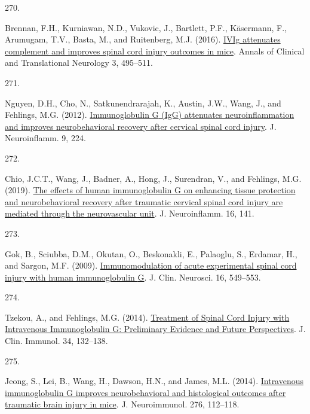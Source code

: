 \documentclass[
]{article}
\newlength{\cslhangindent}
\newlength{\csllabelwidth}
\newlength{\cslentryspacingunit} %
\newenvironment{CSLReferences}[2] %
 {%
  \setlength{\parindent}{0pt}
  \ifodd #1
  \let\oldpar\par
  \def\par{\hangindent=\cslhangindent\oldpar}
  \fi
  \setlength{\parskip}{#2\cslentryspacingunit}
 }%
 {}
\newcommand{\CSLLeftMargin}[1]{\parbox[t]{\csllabelwidth}{#1}}
\newcommand{\CSLRightInline}[1]{\parbox[t]{\linewidth - \csllabelwidth}{#1}\break}
\begin{document}
\begin{CSLReferences}{0}{0}
\leavevmode{}%
\CSLLeftMargin{270. }
\CSLRightInline{Brennan, F.H., Kurniawan, N.D., Vukovic, J., Bartlett, P.F., Käsermann, F., Arumugam, T.V., Basta, M., and Ruitenberg, M.J. (2016). \href{https://doi.org/10.1002/acn3.318}{{IVIg} attenuates complement and improves spinal cord injury outcomes in mice}. Annals of Clinical and Translational Neurology 3, 495--511.}

\leavevmode{}%
\CSLLeftMargin{271. }
\CSLRightInline{Nguyen, D.H., Cho, N., Satkunendrarajah, K., Austin, J.W., Wang, J., and Fehlings, M.G. (2012). \href{https://doi.org/10.1186/1742-2094-9-224}{Immunoglobulin {G} ({IgG}) attenuates neuroinflammation and improves neurobehavioral recovery after cervical spinal cord injury}. J. Neuroinflamm. 9, 224.}

\leavevmode{}%
\CSLLeftMargin{272. }
\CSLRightInline{Chio, J.C.T., Wang, J., Badner, A., Hong, J., Surendran, V., and Fehlings, M.G. (2019). \href{https://doi.org/10.1186/s12974-019-1518-0}{The effects of human immunoglobulin {G} on enhancing tissue protection and neurobehavioral recovery after traumatic cervical spinal cord injury are mediated through the neurovascular unit}. J. Neuroinflamm. 16, 141.}

\leavevmode{}%
\CSLLeftMargin{273. }
\CSLRightInline{Gok, B., Sciubba, D.M., Okutan, O., Beskonakli, E., Palaoglu, S., Erdamar, H., and Sargon, M.F. (2009). \href{https://doi.org/10.1016/j.jocn.2008.04.024}{Immunomodulation of acute experimental spinal cord injury with human immunoglobulin {G}}. J. Clin. Neurosci. 16, 549--553.}

\leavevmode{}%
\CSLLeftMargin{274. }
\CSLRightInline{Tzekou, A., and Fehlings, M.G. (2014). \href{https://doi.org/10.1007/s10875-014-0021-8}{Treatment of {Spinal Cord Injury} with {Intravenous Immunoglobulin G}: {Preliminary Evidence} and {Future Perspectives}}. J. Clin. Immunol. 34, 132--138.}

\leavevmode{}%
\CSLLeftMargin{275. }
\CSLRightInline{Jeong, S., Lei, B., Wang, H., Dawson, H.N., and James, M.L. (2014). \href{https://doi.org/10.1016/j.jneuroim.2014.08.626}{Intravenous immunoglobulin {G} improves neurobehavioral and histological outcomes after traumatic brain injury in mice}. J. Neuroimmunol. 276, 112--118.}


\end{CSLReferences}
\end{document}
